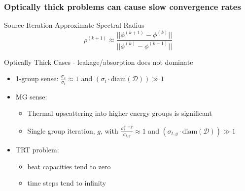 \documentclass[compress,10pt]{beamer}
\begin{document}
\begin{frame}[t]\frametitle{Optically thick problems can cause slow convergence rates}
\begin{block}{Source Iteration Approximate Spectral Radius}
\begin{equation*}
\rho^{(k+1)} \approx \frac{||  \phi^{(k+1)} -  \phi^{(k)} ||}{||  \phi^{(k)} -  \phi^{(k-1)}  ||} 
\end{equation*}
\end{block}
\begin{block}{Optically Thick Cases - leakage/absorption does not dominate}
\begin{itemize}
	\item 1-group sense: $\frac{\sigma_s}{\sigma_t} \approx 1$ and $\left( \sigma_t \cdot \text{diam} (\mathcal{D}) \right) \gg 1$ \vspace{1mm}
	\item MG sense: 
	\begin{itemize}
		\item Thermal upscattering into higher energy groups is significant
		\item Single group iteration, $g$, with $\frac{\sigma_s^{g \rightarrow g}}{\sigma_{t,g}} \approx  1$ and $\left( \sigma_{t,g} \cdot \text{diam} (\mathcal{D}) \right) \gg 1$
	\end{itemize} \vspace{1mm}
	\item TRT problem: 
	\begin{itemize}
		\item heat capacities tend to zero
		\item time steps tend to infinity
	\end{itemize}
\end{itemize}
\end{block}
\end{frame}
%
\end{document}
